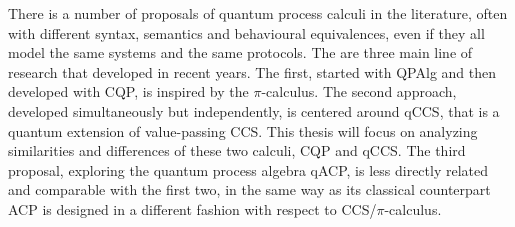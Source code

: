 There is a number of proposals of quantum process calculi in the literature, often with different syntax, semantics and behavioural equivalences, even if they all model the same systems and the same protocols. 
The are three main line of research that developed in recent years. The first, started with QPAlg and then developed with CQP, is inspired by the $\pi$-calculus. 
The second approach, developed simultaneously but independently, is centered around qCCS, that is a quantum extension of value-passing CCS. 
This thesis will focus on analyzing similarities and differences of these two calculi, CQP and qCCS. 
The third proposal, exploring the quantum process algebra qACP, is less directly related and comparable with the first two, in the same way as its classical counterpart ACP is designed in a different fashion with respect to CCS/$\pi$-calculus.
